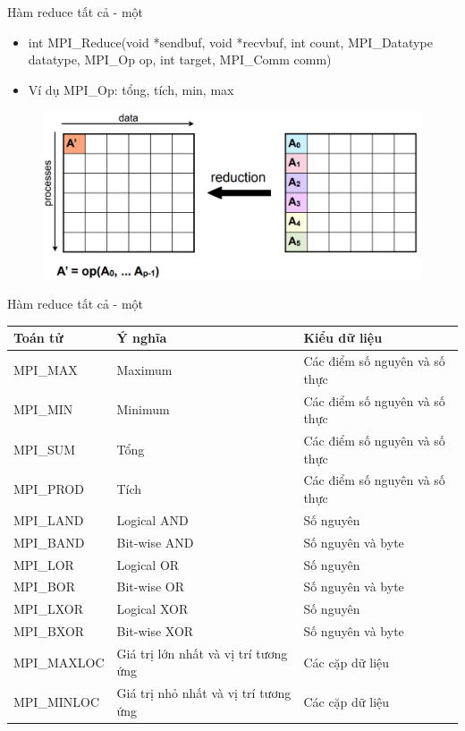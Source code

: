 \documentclass[10pt]{beamer}
\theoremstyle{remark}
\numberwithin{algocf}{section}
\numberwithin{equation}{section}
\numberwithin{dl}{section}
\numberwithin{figure}{section}
\begin{document}
\begin{frame}{Hàm reduce tất cả - một}
    \begin{itemize}
        \item int MPI\_Reduce(void *sendbuf, void *recvbuf,
                             int count, MPI\_Datatype datatype,
                             MPI\_Op op, int target, MPI\_Comm comm)
        \item Ví dụ MPI\_Op: tổng, tích, min, max
    \end{itemize}

    \begin{figure}[H]
        \centering
        \includegraphics[height=0.5\textheight]{figures/MPI/Reduction_All_To_One.png}
    \end{figure}
\end{frame}

\begin{frame}{Hàm reduce tất cả - một}
    \begin{table}[H]
        \centering
        \begin{tabular}{lll}
            \hline
            Toán tử & Ý nghĩa & Kiểu dữ liệu \\
            \hline
            MPI\_MAX & Maximum & Các điểm số nguyên và số thực \\
            MPI\_MIN & Minimum & Các điểm số nguyên và số thực \\
            MPI\_SUM & Tổng & Các điểm số nguyên và số thực \\
            MPI\_PROD & Tích & Các điểm số nguyên và số thực \\
            MPI\_LAND & Logical AND & Số nguyên \\
            MPI\_BAND & Bit-wise AND & Số nguyên và byte \\
            MPI\_LOR & Logical OR & Số nguyên \\
            MPI\_BOR & Bit-wise OR & Số nguyên và byte \\
            MPI\_LXOR & Logical XOR & Số nguyên \\
            MPI\_BXOR & Bit-wise XOR & Số nguyên và byte \\
            MPI\_MAXLOC & Giá trị lớn nhất và vị trí tương ứng & Các cặp dữ liệu \\
            MPI\_MINLOC & Giá trị nhỏ nhất và vị trí tương ứng & Các cặp dữ liệu \\
            \hline
        \end{tabular}
    \end{table}
\end{frame}
\end{document}
